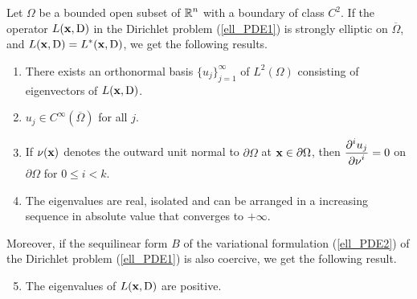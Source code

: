 \begin{theorem}  \label{ell_exist_th4}
Let $\Omega$ be a bounded open subset of $\displaystyle \mathbb{R}^n$ with a
boundary of class $\displaystyle C^2$.  If the operator
$L(\mathbf{x},\operatorname{D})$ in the Dirichlet problem
(\ref{ell_PDE1}) is strongly elliptic on $\overline{\Omega}$, and
$\displaystyle L(\mathbf{x},\operatorname{D})=L^\ast(\mathbf{x},\operatorname{D})$, we get the
following results.
\begin{enumerate}
\item There exists an orthonormal basis $\displaystyle \{u_j\}_{j=1}^\infty$ of
$\displaystyle L^2(\Omega)$ consisting of eigenvectors of $L(\mathbf{x},\operatorname{D})$.
\item $\displaystyle u_j \in C^\infty(\overline{\Omega})$ for all $j$.
\item If $\mathbf{\nu}(\mathbf{x})$ denotes the outward unit normal to
$\partial \Omega$ at $\mathbf{x} \in \partial \Omega$, then
$\displaystyle \frac{\displaystyle \partial^{i}{u_j}} {\displaystyle \partial \mathbf{\nu}^{i}}=0$ on $\partial \Omega$
for $0 \leq i < k$.
\item The eigenvalues are real, isolated and can be arranged in a
increasing sequence in absolute value that converges to $+\infty$.
\end{enumerate}
Moreover, if the sequilinear form $B$ of the variational formulation
(\ref{ell_PDE2}) of the Dirichlet problem (\ref{ell_PDE1}) is
also coercive, we get the following result.
\begin{enumerate}
\setcounter{enumi}{4}
\item The eigenvalues of $L(\mathbf{x},\operatorname{D})$ are positive.
\end{enumerate}
\end{theorem}

